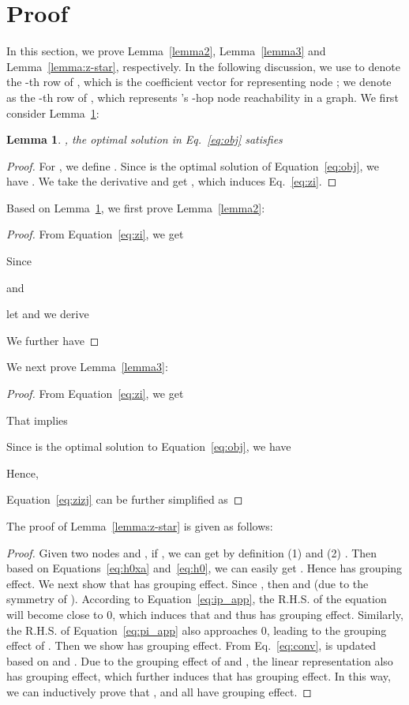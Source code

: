 \documentclass[nohyperref]{article}
\theoremstyle{plain}
\newtheorem{lemma}[theorem]{Lemma}
\theoremstyle{definition}
\theoremstyle{remark}
\begin{document}
\section{Proof}
\label{sec:proof}

In this section, 
we prove Lemma~\ref{lemma2}, Lemma~\ref{lemma3} and Lemma~\ref{lemma:z-star}, respectively.
In the following discussion,
we use 
 to denote the -th row of ,
which is the coefficient vector for representing node ;
we denote  as
the -th row of ,
which represents 's -hop node reachability in a graph.
We first consider Lemma~\ref{lemma1}:
\begin{lemma}
\label{lemma1}
,
the optimal solution  in Eq.~\ref{eq:obj} satisfies

\end{lemma}
\begin{proof}
For ,
we define .
Since  is the optimal solution of Equation~\ref{eq:obj}, 
we have .
We take the derivative and get 
,
which induces Eq.~\ref{eq:zi}.
\end{proof}


Based on Lemma~\ref{lemma1}, 
we first prove Lemma~\ref{lemma2}:
\begin{proof}
From Equation~\ref{eq:zi}, we get 

Since 

and

let  and
we derive

We further have 

\end{proof}

We next prove Lemma~\ref{lemma3}:

\begin{proof}
From Equation~\ref{eq:zi}, we get 

That implies 

Since  is the optimal solution to Equation~\ref{eq:obj}, we have

Hence, 

Equation~\ref{eq:zizj} can be further simplified as

\end{proof}


The proof of Lemma~\ref{lemma:z-star} is given as follows:
\begin{proof}
Given two nodes  and , if ,
we can get by definition
(1) 
and (2) .
Then based on Equations~\ref{eq:h0xa} and~\ref{eq:h0},
we can easily get .
Hence  has grouping effect.
We next show that  has grouping effect.
Since , 
then  and
 (due to the symmetry of ).
According to Equation~\ref{eq:ip_app},
the R.H.S. of the equation will become close to 0, 
which induces that 
and
 thus has grouping effect.
Similarly,
the R.H.S. of Equation~\ref{eq:pi_app} also approaches 0,
leading to the grouping effect of .
Then we show  has grouping effect.
From Eq.~\ref{eq:conv},
 is updated based on  and .
Due to the grouping effect of  and ,
the linear representation  also has grouping effect,
which further induces that
 has grouping effect.
In this way,
we can inductively prove that ,  and  all have grouping effect.


\end{proof}
\end{document}
